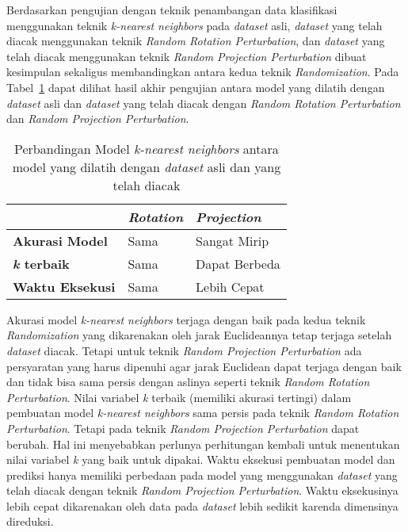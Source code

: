 Berdasarkan pengujian dengan teknik penambangan data klasifikasi menggunakan teknik \textit{k-nearest neighbors} pada \textit{dataset} asli, \textit{dataset} yang telah diacak menggunakan teknik \textit{Random Rotation Perturbation}, dan \textit{dataset} yang telah diacak menggunakan teknik \textit{Random Projection Perturbation} dibuat kesimpulan sekaligus membandingkan antara kedua teknik \textit{Randomization}. Pada Tabel~\ref{table:perbandingan-klasifikasi} dapat dilihat hasil akhir pengujian antara model yang dilatih dengan \textit{dataset} asli dan \textit{dataset} yang telah diacak dengan \textit{Random Rotation Perturbation} dan \textit{Random Projection Perturbation}.

\begin{table}
	\centering
	\caption{Perbandingan Model \textit{k-nearest neighbors} antara model yang dilatih dengan \textit{dataset} asli dan yang telah diacak}
	\begin{tabular}{|l|l|l|}
		\hline
		& \textbf{\textit{Rotation}} & \textbf{\textit{Projection}} \\ \hline
		\textbf{Akurasi Model} & Sama & Sangat Mirip \\
		\textbf{\textit{k} terbaik} & Sama & Dapat Berbeda \\
		\textbf{Waktu Eksekusi} & Sama & Lebih Cepat \\
		\hline
	\end{tabular}
	\label{table:perbandingan-klasifikasi}
\end{table}

Akurasi model \textit{k-nearest neighbors} terjaga dengan baik pada kedua teknik \textit{Randomization} yang dikarenakan oleh jarak Euclideannya tetap terjaga setelah \textit{dataset} diacak. Tetapi untuk teknik \textit{Random Projection Perturbation} ada persyaratan yang harus dipenuhi agar jarak Euclidean dapat terjaga dengan baik dan tidak bisa sama persis dengan aslinya seperti teknik \textit{Random Rotation Perturbation}. Nilai variabel \textit{k} terbaik (memiliki akurasi tertingi) dalam pembuatan model \textit{k-nearest neighbors} sama persis pada teknik \textit{Random Rotation Perturbation}. Tetapi pada teknik \textit{Random Projection Perturbation} dapat berubah. Hal ini menyebabkan perlunya perhitungan kembali untuk menentukan nilai variabel \textit{k} yang baik untuk dipakai. Waktu eksekusi pembuatan model dan prediksi hanya memiliki perbedaan pada model yang menggunakan \textit{dataset} yang telah diacak dengan teknik \textit{Random Projection Perturbation}. Waktu eksekusinya lebih cepat dikarenakan oleh data pada \textit{dataset} lebih sedikit karenda dimensinya direduksi.


